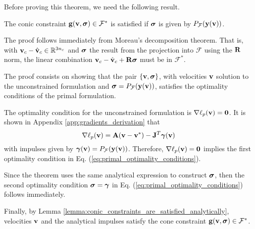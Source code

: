 Before proving this theorem, we need the following result.
\begin{lemma}
    The conic constraint ${\mathbf{g}}({\mathbf{v}}, {\bm\sigma})\in\mathcal{F}^*$ is satisfied
    if ${\bm\sigma}$ is given by $P_\mathcal{F}({\mathbf{y({\mathbf{v}})}})$.
    \label{lemma:conic_constraints_are_satisfied_analytically}
\end{lemma}
\begin{IEEEproof}
    The proof follows immediately from Moreau's decomposition theorem. That is,
    with ${\mathbf{v}}_c - \hat{{\mathbf{v}}}_c\in\mathbb{R}^{3n_c}$ and ${\bm\sigma}$ the
    result from the projection into $\mathcal{F}$ using the ${\mathbf{R}}$ norm, the
    linear combination ${\mathbf{v}}_c - \hat{{\mathbf{v}}}_c + {\mathbf{R}}{\bm\sigma}$ must be in
    $\mathcal{F}^*$.
\end{IEEEproof}
\vspace{0.5cm}
\begin{IEEEproof}
    The proof consists on showing that the pair $\{{\mathbf{v}},{\bm\sigma}\}$, with
    velocities ${\mathbf{v}}$ solution to the unconstrained formulation and
    ${\bm\sigma}=P_\mathcal{F}({\mathbf{y}}({\mathbf{v}}))$, satisfies the optimality conditions
    of the primal formulation.
    
    The optimality condition for the unconstrained formulation is
    $\nabla\ell_p({\mathbf{v}})={\mathbf{0}}$. It is shown in Appendix
    \ref{app:gradients_derivation} that
    \begin{equation}
        \nabla\ell_p({\mathbf{v}})={\mathbf{A}}({\mathbf{v}}-{\mathbf{v}}^*) - {\mathbf{J}}^T{\bm\gamma}({\mathbf{v}})
    \end{equation}
    with impulses given by ${\bm\gamma}({\mathbf{v}})=P_\mathcal{F}({\mathbf{y}}({\mathbf{v}}))$.
    Therefore, $\nabla\ell_p({\mathbf{v}})={\mathbf{0}}$ implies the first optimality
    condition in Eq. (\ref{eq:primal_optimality_conditions}).
    
    Since the theorem uses the same analytical expression to construct
    ${\bm\sigma}$, then the second optimality condition ${\bm\sigma}={\bm\gamma}$ in Eq.
    (\ref{eq:primal_optimality_conditions}) follows immediately.

    Finally, by Lemma \ref{lemma:conic_constraints_are_satisfied_analytically},
    velocities ${\mathbf{v}}$ and the analytical impulses satisfy the cone constraint
    ${\mathbf{g}}({\mathbf{v}}, {\bm\sigma})\in\mathcal{F}^*$.
\end{IEEEproof}

